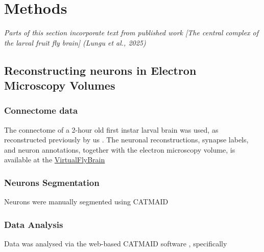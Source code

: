 
\chapter{Methods}
\textit{Parts of this section incorporate text from published work [The central complex of the larval fruit fly brain] (Lungu et al., 2025)}

\section{Reconstructing neurons in Electron Microscopy Volumes}
    \subsection{Connectome data}
    The connectome of a 2-hour old first instar larval brain was used, as reconstructed previously by us \citep{winding2023connectome}. The neuronal reconstructions, synapse labels, and neuron annotations, together with the electron microscopy volume, is available at the \href{https://l1em.catmaid.virtualflybrain.org/?pid=1&zp=108250&yp=82961.59999999999&xp=54210.799999999996&tool=tracingtool&sid0=1&s0=2.4999999999999996&help=true&layout=h(XY,%20%7B%20type:%20%22neuron-search%22,%20id:%20%22neuron-search-1%22,%20options:%20%7B%22annotation-name%22:%20%22papers%22%7D%7D,%200.6)}{VirtualFlyBrain}

    \subsection{Neurons Segmentation}
    Neurons were manually segmented using CATMAID 
    \subsection{Data Analysis}
    Data was analysed via the web-based CATMAID software \citep{schneider2016quantitative, saalfeld2009catmaid}, specifically


